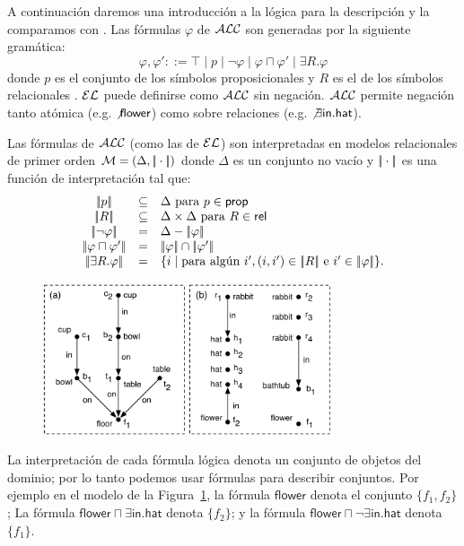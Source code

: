 A continuaci\'on daremos una introducci\'on a la l\'ogica para la descripci\'on \alc y la comparamos con \el. Las f\'ormulas $\varphi$ de $\mathcal{ALC}$ son generadas por la siguiente gram\'atica:
$$
\varphi,\varphi' ::= \top \mid p \mid \neg \varphi \mid \varphi \sqcap \varphi'
\mid \exists R. \varphi
$$
donde $p$ es el conjunto de los s\'imbolos proposicionales \prop y $R$ es el de los s\'imbolos relacionales \rel. $\mathcal{EL}$ puede definirse como $\mathcal{ALC}$ sin negaci\'on. $\mathcal{ALC}$ permite negaci\'on tanto at\'omica (e.g. $\not \mathsf{flower}$) como sobre relaciones (e.g. $\not \exists \mathsf{in}.\mathsf{hat}$).

Las f\'ormulas de $\mathcal{ALC}$ (como las de $\mathcal{EL}$) son interpretadas en modelos relacionales de primer orden $\mathcal{M} = (\Delta,|\!|\cdot|\!|)$ donde
$\Delta$ es un conjunto no vac\'io y $|\!|\cdot|\!|$ es una funci\'on de interpretaci\'on tal que:
$$
\begin{array}{ccl}
\interp{p} & \subseteq & \Delta  \mbox{ para $p \in \prop$}\\
\interp{R} & \subseteq & \Delta \times \Delta  \mbox{ para $R \in \rel$}\\
\interp{\neg \varphi} & = & \Delta - \interp{\varphi}\\
\interp{\varphi \sqcap \varphi'} & = & \interp{\varphi} \cap \interp{\varphi'}\\
\interp{\exists R.\varphi} & = & \{i \mid \mbox{para alg\'un } i', (i,i') \in \interp{R} \mbox{ e } i' \in \interp{\varphi} \}.\\
\end{array}
$$

\begin{figure}[t]
\begin{center}
\includegraphics[width=8.5cm]{pic-dale-haddock.pdf}
\caption{}
\label{fig:dale-haddock}
\end{center}
\end{figure}


La interpretaci\'on de cada f\'ormula l\'ogica denota un conjunto de objetos del dominio; por lo tanto podemos usar f\'ormulas para describir conjuntos. Por ejemplo en el modelo de la Figura~\ref{fig:dale-haddock}, la f\'ormula
$\mathsf{flower}$ denota el conjunto $\{f_1,f_2\}$; La f\'ormula
$\mathsf{flower} \sqcap \exists \mathsf{in}.\mathsf{hat}$ denota
$\{f_2\}$; y la f\'ormula $\mathsf{flower} \sqcap \neg
\exists \mathsf{in}.\mathsf{hat}$ denota $\{f_1\}$.\\

